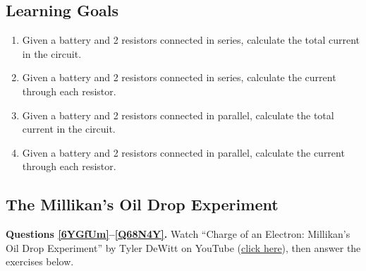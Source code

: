 \documentclass[answers]{exam}
\begin{document}
\subsection*{Learning Goals}

\begin{enumerate}
    \item Given a battery and 2 resistors connected in series, calculate the total current in the circuit.
    \item Given a battery and 2 resistors connected in series, calculate the current through each resistor.
    \item Given a battery and 2 resistors connected in parallel, calculate the total current in the circuit.
    \item Given a battery and 2 resistors connected in parallel, calculate the current through each resistor.
\end{enumerate}


\subsection*{The Millikan's Oil Drop Experiment}

\textbf{Questions \ref{6YGfUm}--\ref{Q68N4Y}.} Watch ``Charge of an Electron: Millikan's Oil Drop Experiment'' by Tyler DeWitt on YouTube (\href{https://youtu.be/2HhaQtvICe8}{click here}), then answer the exercises below.
\end{document}
